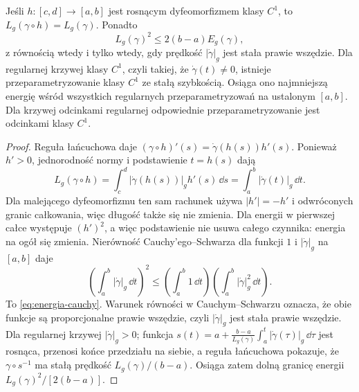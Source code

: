 \begin{stwierdzenie}
\label{prop:energia-dlugosc}
Jeśli $h:[c,d]\to[a,b]$ jest rosnącym dyfeomorfizmem
klasy $C^1$, to
$L_g(\gamma\circ h)=L_g(\gamma)$.
Ponadto
\begin{equation}\label{eq:energia-cauchy}
 L_g(\gamma)^2\leq 2(b-a)E_g(\gamma),
\end{equation}
z równością wtedy i tylko wtedy, gdy prędkość
$|\dot\gamma|_g$ jest stała prawie wszędzie.
Dla regularnej krzywej klasy $C^1$, czyli takiej, że
$\dot\gamma(t)\ne0$, istnieje przeparametryzowanie klasy
$C^1$ ze stałą szybkością. Osiąga ono najmniejszą energię
wśród wszystkich regularnych przeparametryzowań na
ustalonym $[a,b]$. Dla krzywej odcinkami regularnej
odpowiednie przeparametryzowanie jest odcinkami klasy $C^1$.
\end{stwierdzenie}
\begin{proof}
Reguła łańcuchowa daje
$(\gamma\circ h)'(s)=\dot\gamma(h(s))h'(s)$.
Ponieważ $h'>0$, jednorodność normy i podstawienie
$t=h(s)$ dają
\[
 L_g(\gamma\circ h)
 =\int_c^d|\dot\gamma(h(s))|_g h'(s)\,\dd s
 =\int_a^b|\dot\gamma(t)|_g\,\dd t.
\]
Dla malejącego dyfeomorfizmu ten sam rachunek używa
$|h'|=-h'$ i odwróconych granic całkowania, więc długość
także się nie zmienia. Dla energii w pierwszej całce występuje
$(h')^2$, a więc podstawienie nie usuwa całego
czynnika: energia na ogół się zmienia.
Nierówność Cauchy'ego--Schwarza dla funkcji
$1$ i $|\dot\gamma|_g$ na $[a,b]$ daje
\[
 \left(\int_a^b|\dot\gamma|_g\,\dd t\right)^2
 \leq\left(\int_a^b1\,\dd t\right)
      \left(\int_a^b|\dot\gamma|_g^2\,\dd t\right).
\]
To \eqref{eq:energia-cauchy}. Warunek równości
w Cauchym--Schwarzu oznacza, że obie funkcje
są proporcjonalne prawie wszędzie, czyli
$|\dot\gamma|_g$ jest stała prawie wszędzie.
Dla regularnej krzywej $|\dot\gamma|_g>0$;
funkcja
$s(t)=a+\frac{b-a}{L_g(\gamma)}
               \int_a^t|\dot\gamma(\tau)|_g\,\dd\tau$
jest rosnąca, przenosi końce przedziału na
siebie, a reguła łańcuchowa pokazuje,
że $\gamma\circ s^{-1}$ ma stałą prędkość
$L_g(\gamma)/(b-a)$. Osiąga zatem dolną granicę
energii $L_g(\gamma)^2/[2(b-a)]$.
\end{proof}

